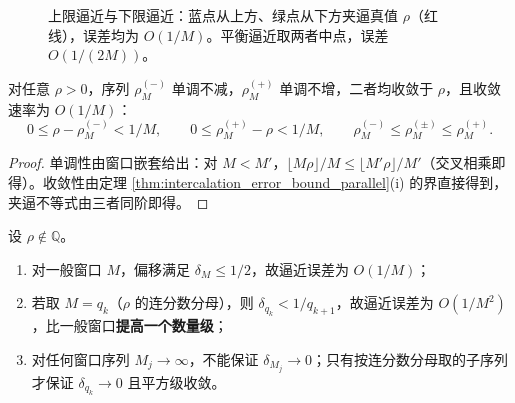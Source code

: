 \begin{figure}[htbp]
\centering
{}
\caption{上限逼近与下限逼近：蓝点从上方、绿点从下方夹逼真值 $\rho$（红线），误差均为 $O(1/M)$。平衡逼近取两者中点，误差 $O(1/(2M))$。}
\label{fig:bounded_approximation}
\end{figure}

\begin{proposition}[夹逼的收敛性]\label{prop:sandwich_convergence_parallel}
对任意 $\rho>0$，序列 $\rho^{(-)}_M$ 单调不减，$\rho^{(+)}_M$ 单调不增，二者均收敛于 $\rho$，且收敛速率为 $O(1/M)$：
\[
0\le\rho-\rho^{(-)}_M<1/M,\qquad 0\le\rho^{(+)}_M-\rho<1/M,\qquad
\rho^{(-)}_M\le\rho^{(\pm)}_M\le\rho^{(+)}_M .
\]
\end{proposition}

\begin{proof}
单调性由窗口嵌套给出：对 $M<M'$，$\lfloor M\rho\rfloor/M\le\lfloor M'\rho\rfloor/M'$（交叉相乘即得）。收敛性由定理 \ref{thm:intercalation_error_bound_parallel}(i) 的界直接得到，夹逼不等式由三者同阶即得。
\end{proof}

\begin{proposition}[误差与分母的标度]\label{prop:error_denominator_scaling_parallel}
设 $\rho\notin\mathbb{Q}$。
\begin{enumerate}[label=(\roman*)]
    \item 对一般窗口 $M$，偏移满足 $\delta_M\le1/2$，故逼近误差为 $O(1/M)$；
    \item 若取 $M=q_k$（$\rho$ 的连分数分母），则 $\delta_{q_k}<1/q_{k+1}$，故逼近误差为 $O(1/M^2)$，比一般窗口\textbf{提高一个数量级}；
    \item 对任何窗口序列 $M_j\to\infty$，不能保证 $\delta_{M_j}\to0$；只有按连分数分母取的子序列才保证 $\delta_{q_k}\to0$ 且平方级收敛。
\end{enumerate}
\end{proposition}

